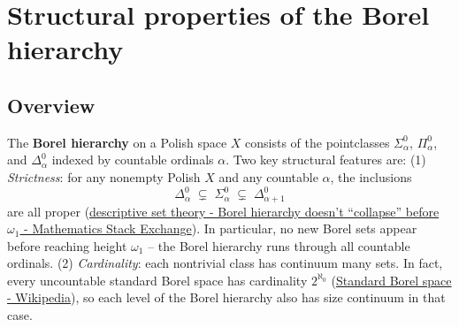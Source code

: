 \documentclass[11pt]{article}
\begin{document}
\section{Structural properties of the Borel hierarchy}
\label{structural-properties-of-the-borel-hierarchy}
\subsection{Overview}
\label{overview-5}
The \textbf{Borel hierarchy} on a Polish space \(X\) consists of the
pointclasses \(\Sigma^0_\alpha\), \(\Pi^0_\alpha\), and
\(\Delta^0_\alpha\) indexed by countable ordinals \(\alpha\). Two key
structural features are: (1) \emph{Strictness}: for any nonempty Polish \(X\)
and any countable \(\alpha\), the inclusions
\[\Delta^0_\alpha\;\subsetneq\;\Sigma^0_\alpha\;\subsetneq\;\Delta^0_{\alpha+1}\]
are all proper
(\href{https://math.stackexchange.com/questions/509326/borel-hierarchy-doesnt-collapse-before-omega-1\#:\~:text=,0\_\%7B\%5Cxi\%2B1}{descriptive
set theory - Borel hierarchy doesn't ``collapse'' before \(\omega_1\) -
Mathematics Stack Exchange}). In particular, no new Borel sets appear
before reaching height \(\omega_1\) -- the Borel hierarchy runs through
all countable ordinals. (2) \emph{Cardinality}: each nontrivial class has
continuum many sets. In fact, every uncountable standard Borel space has
cardinality \(2^{\aleph_0}\)
(\href{https://en.wikipedia.org/wiki/Standard\_Borel\_space\#:\~:text=one\%20of\%20\%281\%29\%20Image\%3A\%20,is\%20reminiscent\%20of\%20Maharam\%27s\%20theorem}{Standard
Borel space - Wikipedia}), so each level of the Borel hierarchy also
has size continuum in that case.
\end{document}
